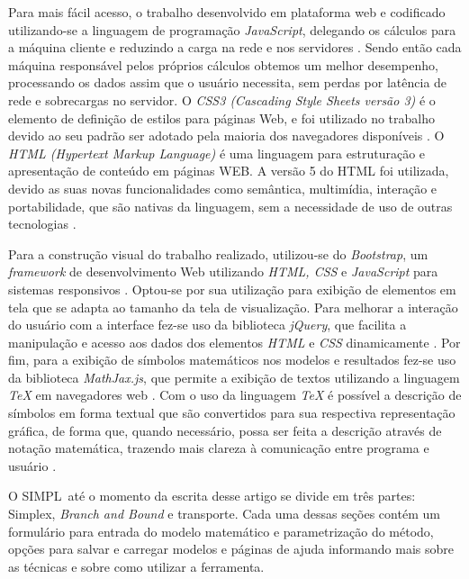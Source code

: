 \documentclass [11pt]{articleSBPO}
\newcommand{\sigla}[0] {SIMPL}
\begin{document}
Para mais fácil acesso, o trabalho desenvolvido em plataforma web e codificado utilizando-se a linguagem de programação \textit{JavaScript}, delegando os cálculos para a máquina cliente e reduzindo a carga na rede e nos servidores \cite{livrojavascript1}. Sendo então cada máquina responsável pelos próprios cálculos obtemos um melhor desempenho, processando os dados assim que o usuário necessita, sem perdas por latência de rede e sobrecargas no servidor. O \textit{CSS3 (Cascading Style Sheets versão 3)} é o elemento de definição de estilos para páginas Web, e foi utilizado no trabalho devido ao seu padrão ser adotado pela maioria dos navegadores disponíveis \cite{livroweb2}. O \textit{HTML (Hypertext Markup Language)} é uma linguagem para estruturação e apresentação de conteúdo em páginas WEB. A versão 5 do HTML foi utilizada, devido as suas novas funcionalidades como semântica, multimídia, interação e portabilidade, que são nativas da linguagem, sem a necessidade de uso de outras tecnologias \cite{livroweb1}.

Para a construção visual do trabalho realizado, utilizou-se do \textit{Bootstrap}, um \textit{framework} de desenvolvimento Web utilizando \textit{HTML, CSS} e \textit{JavaScript} para sistemas responsivos \cite{bootstrap}. Optou-se por sua utilização para exibição de elementos em tela que se adapta ao tamanho da tela de visualização. Para melhorar a interação do usuário com a interface fez-se uso da biblioteca \textit{jQuery}, que facilita a manipulação e acesso aos dados dos elementos \textit{HTML} e \textit{CSS} dinamicamente \cite{jquery}. Por fim, para a exibição de símbolos matemáticos nos modelos e resultados fez-se uso da biblioteca \textit{MathJax.js}, que permite a exibição de textos utilizando a linguagem \textit{TeX} em navegadores web \cite{mathjax}. Com o uso da linguagem \textit{TeX} é possível a descrição de símbolos em forma textual que são convertidos para sua respectiva representação gráfica, de forma que, quando necessário, possa ser feita a descrição através de notação matemática, trazendo mais clareza à comunicação entre programa e usuário \cite{tex}.

O \sigla\ até o momento da escrita desse artigo se divide em três partes: Simplex, \textit{Branch and Bound} e transporte. Cada uma dessas seções contém um formulário para entrada do modelo matemático e parametrização do método, opções para salvar e carregar modelos e páginas de ajuda informando mais sobre as técnicas e sobre como utilizar a ferramenta.
\end{document}
